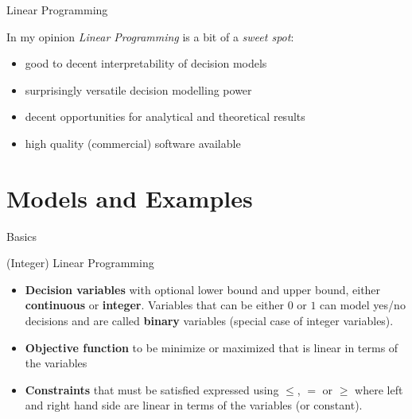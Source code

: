 \documentclass[10pt]{beamer}
\begin{document}
\begin{frame}[fragile]{Linear Programming}

In my opinion \emph{Linear Programming} is a bit of a \emph{sweet spot}:

\begin{itemize}
	\item good to decent interpretability of decision models 
	\item surprisingly versatile decision modelling power
	\item decent opportunities for analytical and theoretical results 
	\item high quality (commercial) software available
\end{itemize}

\end{frame}

\section{Models and Examples}

\begin{frame}[fragile]{Basics}
\begin{block}{(Integer) Linear Programming}
\begin{itemize} 
	\item \textbf{Decision variables} with optional lower bound and upper bound, either \textbf{continuous} or \textbf{integer}. Variables that can be either $0$ or $1$ can model yes/no decisions and are called \textbf{binary} variables (special case of integer variables).
	\item \textbf{Objective function} to be minimize or maximized that is linear in terms of the variables
	\item \textbf{Constraints} that must be satisfied expressed using $\leq$, $=$ or $\geq$ where left and right hand side are linear in terms of the variables (or constant).
\end{itemize}
\end{block}
\end{frame}
\end{document}
